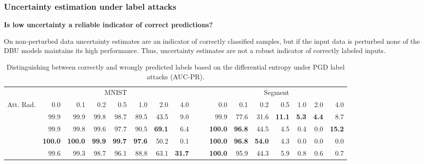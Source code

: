 \clearpage
\subsubsection{Uncertainty estimation under label attacks}

\textbf{Is low uncertainty a reliable indicator of correct predictions?}

On non-perturbed data uncertainty estimates are an indicator of correctly classified samples, but if the input data is perturbed none of the DBU models maintains its high performance. Thus, uncertainty estimates are not a robust indicator of correctly labeled inputs. 

\begin{table}[htbp!]
 	\centering
 	\caption{Distinguishing between correctly and wrongly predicted labels based on the differential entropy under PGD label attacks (AUC-PR).}
 	\begin{small}
 		\begin{tabular}{@{}rrrrrrrrc|crrrrrrr@{}}
 			\toprule
 			& \multicolumn{7}{c}{MNIST} & & & \multicolumn{7}{c}{Segment} \\
 			\cmidrule{2-8}  \cmidrule{11-16}
 			Att. Rad. & 0.0 & 0.1 & 0.2 & 0.5 & 1.0 & 2.0 & 4.0 & & & 0.0 & 0.1 & 0.2 & 0.5 & 1.0 & 2.0 & 4.0 \\
 			\midrule
 			\PostNet  &  99.9 &   99.9 &  99.8 &  98.7 &  89.5 &  43.5 &   9.0 & & 
 			          &  99.9 &  77.6 &  31.6 &  \bf{11.1} &  \bf{5.3} &  \bf{4.4} &   8.7 \\
 			\PriorNet &  99.9 &   99.8 &  99.6 &  97.7 &  90.5 &  \bf{69.1} &   6.4 & & 
 			          &  \bf{100.0} &  \bf{96.8} &  44.5 &   4.5 &  0.4 &  0.0 &  \bf{15.2} \\
 		    \DDNet    &  \bf{100.0} &  \bf{100.0} &  \bf{99.9} &  \bf{99.7} &  \bf{97.6} &  50.2 &   0.1 & &
 		              &  \bf{100.0} &  \bf{96.8} &  \bf{54.0} &   4.3 &  0.0 &  0.0 &   0.0 \\
 		    \EvNet    &  99.6 &   99.3 &  98.7 &  96.1 &  88.8 &  63.1 &  \bf{31.7} & &
 		              &  \bf{100.0} &  95.9 &  44.3 &   5.9 &  0.8 &  0.6 &   0.7 \\
 			\bottomrule
 		\end{tabular}
 	\end{small}
 	\label{tab:conf_label_attack_2}
\end{table}



